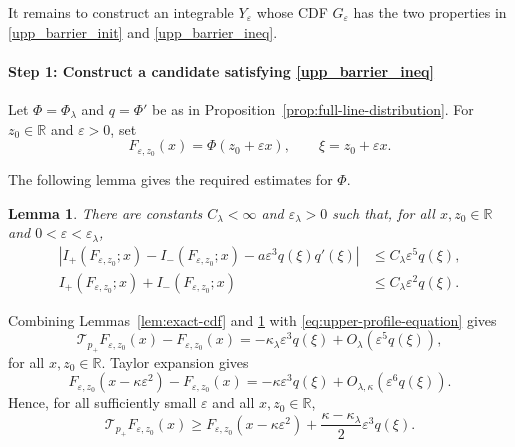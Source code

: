 \documentclass[12pt,preprint]{amsart}
\numberwithin{equation}{section}
\theoremstyle{plain}
\newtheorem{lemma}[theorem]{Lemma}
\theoremstyle{definition}
\newcommand{\R}{\mathbb R}
\begin{document}
It remains to construct an integrable $Y_\varepsilon$ whose CDF
$G_\varepsilon$ has the two properties in \eqref{upp_barrier_init}
and \eqref{upp_barrier_ineq}.

\paragraph*{Step 1: Construct a candidate satisfying \eqref{upp_barrier_ineq}}
 Let
$\Phi=\Phi_{\lambda}$ and $q=\Phi'$ be as in
Proposition~\ref{prop:full-line-distribution}.  For $z_0\in\mathbb R$
and $\varepsilon>0$, set
\[
 F_{\varepsilon,z_0}(x)=\Phi(z_0+\varepsilon x),
 \qquad
 \xi=z_0+\varepsilon x.
\]

The following lemma gives the
required estimates for $\Phi$.
\begin{lemma}
\label{lem:weighted-consistency}
There are constants $C_\lambda<\infty$ and $\varepsilon_\lambda>0$
such that, for all $x,z_0\in\mathbb R$ and
$0<\varepsilon<\varepsilon_\lambda$,
\begin{align}
 \left|I_+(F_{\varepsilon,z_0};x)-I_-(F_{\varepsilon,z_0};x)
       -a\varepsilon^3q(\xi)q'(\xi)\right|
 &\le C_\lambda\varepsilon^5q(\xi),
 \label{eq:weighted-difference}\\
 I_+(F_{\varepsilon,z_0};x)+I_-(F_{\varepsilon,z_0};x)
 &\le C_\lambda\varepsilon^2q(\xi).
 \label{eq:weighted-sum}
\end{align}
\end{lemma}

Combining Lemmas~\ref{lem:exact-cdf} and
\ref{lem:weighted-consistency} with
\eqref{eq:upper-profile-equation} gives
\begin{equation*}
 \mathcal T_{p_+}F_{\varepsilon,z_0}(x)
 -F_{\varepsilon,z_0}(x)
 =-\kappa_{\lambda}\varepsilon^3q(\xi)
  +O_{\lambda}(\varepsilon^5q(\xi)),
\end{equation*}
for all $x,z_0\in\R$.  Taylor expansion gives
\begin{equation*}
 F_{\varepsilon,z_0}(x-\kappa\varepsilon^2)
 -F_{\varepsilon,z_0}(x)
 =-\kappa\varepsilon^3q(\xi)
  +O_{\lambda,\kappa}(\varepsilon^6q(\xi)).
\end{equation*}
Hence, for all sufficiently small $\varepsilon$ and all
$x,z_0\in\mathbb R$,
\begin{equation}
 \mathcal T_{p_+}F_{\varepsilon,z_0}(x)
 \ge F_{\varepsilon,z_0}(x-\kappa\varepsilon^2)
 +\frac{\kappa-\kappa_{\lambda}}{2}\varepsilon^3q(\xi).
 \label{eq:strict-untruncated-upper}
\end{equation}
\end{document}
